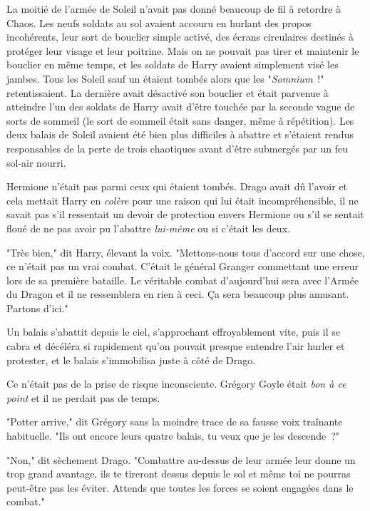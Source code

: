La moitié de l'armée de Soleil n'avait pas donné beaucoup de fil à retordre à Chaos. Les neufs soldats au sol avaient accouru en hurlant des propos incohérents, leur sort de bouclier simple activé, des écrans circulaires destinés à protéger leur visage et leur poitrine. Mais on ne pouvait pas tirer et maintenir le bouclier en même temps, et les soldats de Harry avaient simplement visé les jambes. Tous les Soleil sauf un étaient tombés alors que les "\emph{Somnium}~!" retentissaient. La dernière avait désactivé son bouclier et était parvenue à atteindre l'un des soldats de Harry avait d'être touchée par la seconde vague de sorts de sommeil (le sort de sommeil était sans danger, même à répétition). Les deux balais de Soleil avaient été bien plus difficiles à abattre et s'étaient rendus responsables de la perte de trois chaotiques avant d'être submergés par un feu sol-air nourri.

Hermione n'était pas parmi ceux qui étaient tombés. Drago avait dû l'avoir et cela mettait Harry en \emph{colère} pour une raison qui lui était incompréhensible, il ne savait pas s'il ressentait un devoir de protection envers Hermione ou s'il se sentait floué de ne pas avoir pu l'abattre \emph{lui-même} ou si c'était les deux.

"Très bien," dit Harry, élevant la voix. "Mettons-nous tous d'accord sur une chose, ce n'était pas un vrai combat. C'était le général Granger commettant une erreur lors de sa première bataille. Le véritable combat d'aujourd'hui sera avec l'Armée du Dragon et il ne ressemblera en rien à ceci. Ça sera beaucoup plus amusant. Partons d'ici."

\later

Un balais s'abattit depuis le ciel, s'approchant effroyablement vite, puis il se cabra et décéléra si rapidement qu'on pouvait presque entendre l'air hurler et protester, et le balais s'immobilisa juste à côté de Drago.

Ce n'était pas de la prise de risque inconsciente. Grégory Goyle était \emph{bon à ce point} et il ne perdait pas de temps.

"Potter arrive," dit Grégory sans la moindre trace de sa fausse voix traînante habituelle. "Ils ont encore leurs quatre balais, tu veux que je les descende~?"

"Non," dit sèchement Drago. "Combattre au-dessus de leur armée leur donne un trop grand avantage, ils te tireront dessus depuis le sol et même toi ne pourras peut-être pas les éviter. Attends que toutes les forces se soient engagées dans le combat."

